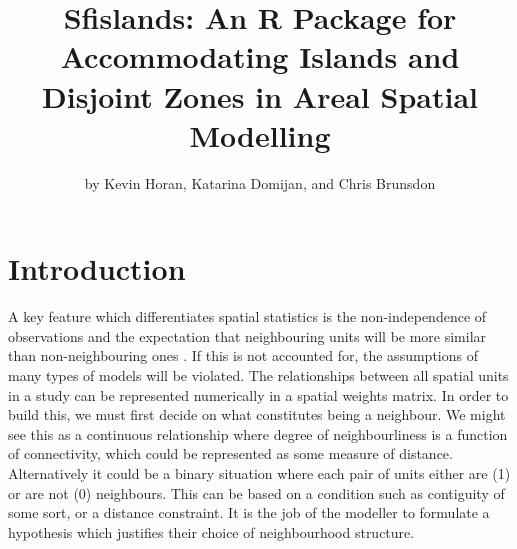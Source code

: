 \title{Sfislands: An R Package for Accommodating Islands and Disjoint Zones in Areal Spatial Modelling}


\author{by Kevin Horan, Katarina Domijan, and Chris Brunsdon}

\maketitle


\section{Introduction}\label{introduction}

A key feature which differentiates spatial statistics is the
non-independence of observations and the expectation that neighbouring
units will be more similar than non-neighbouring ones \citep{tobler}. If this
is not accounted for, the assumptions of many types of models will be
violated. The relationships between all spatial units in a study can be
represented numerically in a spatial weights matrix. In order to build
this, we must first decide on what constitutes being a neighbour. We might
see this as a continuous relationship where degree of neighbourliness is
a function of connectivity, which could be represented as some measure
of distance. Alternatively it could be a binary situation where each
pair of units either are (1) or are not (0) neighbours. This can be
based on a condition such as contiguity of some sort, or a distance
constraint. It is the job of the modeller to formulate a hypothesis
which justifies their choice of neighbourhood structure.

